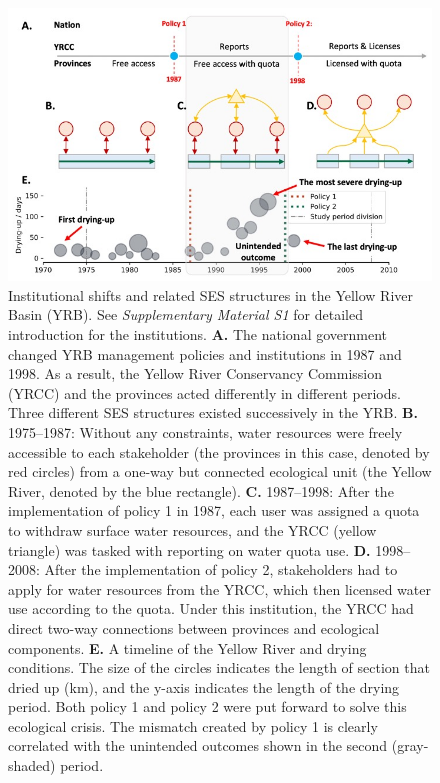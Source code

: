 \documentclass{article}
\begin{document}
\begin{figure}[!ht]
    \centering
    \includegraphics[width=12cm]{../../../figs/diagrams/structure.jpg}
	\caption{
		Institutional shifts and related SES structures in the Yellow River Basin (YRB). See \textit{Supplementary Material S1} for detailed introduction for the institutions.
		\textbf{A.} The national government changed YRB management policies and institutions in 1987 and 1998. As a result, the Yellow River Conservancy Commission (YRCC) and the provinces acted differently in different periods. Three different SES structures existed successively in the YRB.
		\textbf{B.} 1975–1987: Without any constraints, water resources were freely accessible to each stakeholder (the provinces in this case, denoted by red circles) from a one-way but connected ecological unit (the Yellow River, denoted by the blue rectangle).
		\textbf{C.} 1987–1998: After the implementation of policy 1 in 1987, each user was assigned a quota to withdraw surface water resources, and the YRCC (yellow triangle) was tasked with reporting on water quota use.
		\textbf{D.} 1998–2008: After the implementation of policy 2, stakeholders had to apply for water resources from the YRCC, which then licensed water use according to the quota. Under this institution, the YRCC had direct two-way connections between provinces and ecological components.
		\textbf{E.} A timeline of the Yellow River and drying conditions. The size of the circles indicates the length of section that dried up (km), and the y-axis indicates the length of the drying period. Both policy 1 and policy 2 were put forward to solve this ecological crisis. The mismatch created by policy 1 is clearly correlated with the unintended outcomes shown in the second (gray-shaded) period.
	}
	\label{fig:structure}
\end{figure}
\end{document}
